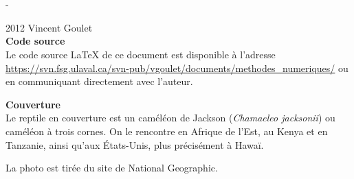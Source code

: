 

\cleardoublepage

\begin{adjustwidth*}{13.1mm}{-72mm}
  \sffamily
  \raggedright
  \vspace*{5mm}
  \thetitle \\
  \vspace*{3cm}
  \theauthor \\
  \vspace*{\fill}
  \thedate
\end{adjustwidth*}
\clearpage

\begingroup
\calccentering{\unitlength}
\begin{adjustwidth*}{\unitlength}{-\unitlength}
  \small
  \setlength{\parindent}{0pt}
  \setlength{\parskip}{\baselineskip}

  {\textcopyright} 2012 Vincent Goulet \\

  

  \textbf{Code source} \\
  Le code source {\LaTeX} de ce document est disponible à l'adresse
    \url{https://svn.fsg.ulaval.ca/svn-pub/vgoulet/documents/methodes_numeriques/}
  ou en communiquant directement avec l'auteur.

  \textbf{Couverture} \\
  Le reptile en couverture est un caméléon de Jackson (\emph{Chamaeleo
    jacksonii}) ou caméléon à trois cornes. On le rencontre en Afrique
  de l'Est, au Kenya et en Tanzanie, ainsi qu'aux États-Unis, plus
  précisément à Hawaï.

  La photo est tirée du site de National Geographic.
\end{adjustwidth*}
\endgroup

\clearpage

